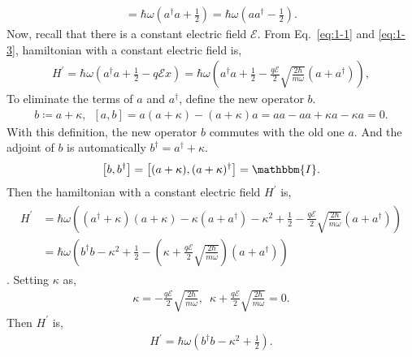 \documentclass[floatfix,nofootinbib,superscriptaddress,fleqn]{revtex4-2}
\begin{document}
\begin{itemize}
\begin{align}
    = \hbar\omega\left(a^\dagger a + \frac{1}{2}\right)
    = \hbar\omega\left(a a^\dagger - \frac{1}{2}\right).
  \end{align}
  Now, recall that there is a constant electric field $\mathcal{E}$. From Eq.~\eqref{eq:1-1}
   and \eqref{eq:1-3}, hamiltonian with a constant electric field is,
   \begin{align}
    H^\prime = \hbar\omega\left(a^\dagger a + \frac{1}{2}-q\mathcal{E}x\right)
    = \hbar\omega\left(a^\dagger a + \frac{1}{2}-\frac{q\mathcal{E}}{2}
    \sqrt{\frac{2\hbar}{m\omega}}\left(a+a^\dagger\right)\right),
   \end{align}  
   To eliminate the terms of $a$ and $a^\dagger$, define the new operator $b$.
   \begin{align}
    b \coloneqq a + \kappa,\,\,\,
    \left[a,b\right] = a(a+\kappa)-(a+\kappa)a = aa-aa+\kappa a-\kappa a=0.
   \end{align}
   With this definition, the new operator $b$ commutes with the old one $a$. 
   And the adjoint of $b$ is automatically $b^\dagger = a^\dagger+\kappa$.
   \begin{align}
     \left[b,b^\dagger\right] = \left[(a+\kappa),(a+\kappa)^\dagger\right] = \mathbbm{I}.
   \end{align}
   Then the hamiltonian with a constant electric field $H^\prime$ is,
   \begin{align}
    \begin{split}
      H^\prime &= \hbar\omega\left((a^\dagger+\kappa)(a+\kappa)-\kappa(a+a^\dagger)-\kappa^2
      + \frac{1}{2}-\frac{q\mathcal{E}}{2}
      \sqrt{\frac{2\hbar}{m\omega}}\left(a+a^\dagger\right)\right)  \\
      &=\hbar\omega\left(b^\dagger b-\kappa^2
      + \frac{1}{2}-\left(\kappa+\frac{q\mathcal{E}}{2}
      \sqrt{\frac{2\hbar}{m\omega}}\right)\left(a+a^\dagger\right)\right)
    \end{split}
   \end{align}.
   Setting $\kappa$ as,
   \begin{align}
    \kappa = -\frac{q\mathcal{E}}{2}
    \sqrt{\frac{2\hbar}{m\omega}},\,\,\,
    \kappa+\frac{q\mathcal{E}}{2}
    \sqrt{\frac{2\hbar}{m\omega}} = 0.
   \end{align}
   Then $H^\prime$ is,
   \begin{align}
    H^\prime = \hbar\omega\left(b^\dagger b-\kappa^2
    + \frac{1}{2}\right).
   \end{align}

\end{itemize}
\end{document}
